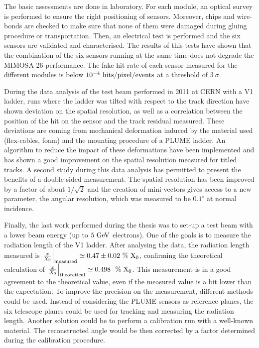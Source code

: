 The basic assessments are done in laboratory.
For each module, an optical survey is performed to ensure the right positioning of sensors.
Moreover, chips and wire-bonds are checked to make sure that none of them were damaged during gluing procedure or transportation.
Then, an electrical test is performed and the six sensors are validated and characterised.
The results of this tests have shown that the combination of the six sensors running at the same time does not degrade the \gls{MIMOSA}-26 performance.
The fake hit rate of each sensor measured for the different modules is below $10^{-4}~\rm{hits/pixel/events}$ at a threshold of $3~\sigma$.

During the data analysis of the test beam performed in 2011 at \gls{CERN} with a V1 ladder, runs where the ladder was tilted with respect to the track direction have shown deviation on the spatial resolution, as well as a correlation between the position of the hit on the sensor and the track residual measured.
These deviations are coming from mechanical deformation induced by the material used (flex-cables, foam) and the mounting procedure of a \gls{PLUME} ladder.
An algorithm to reduce the impact of these deformations have been implemented and has shown a good improvement on the spatial resolution measured for titled tracks.
A second study during this data analysis has permitted to present the benefits of a double-sided measurement. 
The spatial resolution has been improved by a factor of about $1/\sqrt{2}$ and the creation of mini-vectors gives access to a new parameter, the angular resolution, which was measured to be $0.1^{\circ}$ at normal incidence.

Finally, the last work performed during the thesis was to set-up a test beam with a lower beam energy (up to $5~\rm{GeV}$ electrons).
One of the goals is to measure the radiation length of the V1 ladder.
After analysing the data, the radiation length measured is $\left. \frac{x}{X_0} \right|_{\rm{measured}} \simeq 0.47 \pm 0.02~\%~\rm{X_0}$, confirming the theoretical calculation of $\left. \frac{x}{X_0}\right|_{\rm{theoretical}} \simeq 0.498~~\%~\rm{X_0}$.
This measurement is in a good agreement to the theoretical value, even if the measured value is a bit lower than the expectation. 
To improve the precision on the measurement, different methods could be used.
Instead of considering the \gls{PLUME} sensors as reference planes, the six telescope planes could be used for tracking and measuring the radiation length.
Another solution could be to perform a calibration run with a well-known material. 
The reconstructed angle would be then corrected by a factor determined during the calibration procedure.


